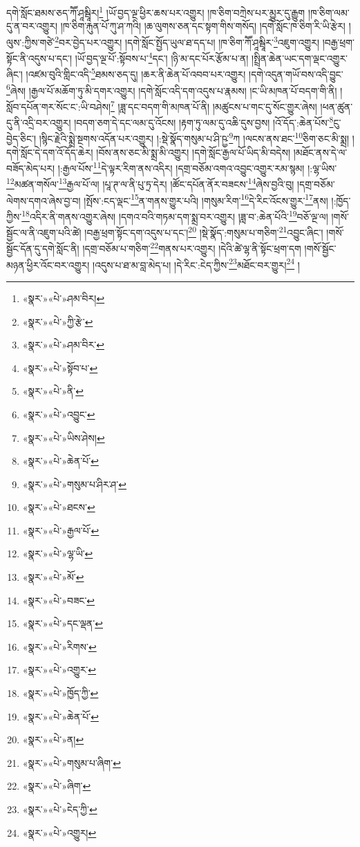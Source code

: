 དགེ་སློང་ཐམས་ཅད་ཀཽ་ཤཱམྦཱིར།\footnote{«སྣར་»«པེ་»ཤམ་བིར།} །ཡོ་བྱད་ལྔ་ཕྱིར་ཆས་པར་འགྱུར། །ཁ་ཅིག་བཀྲེས་པར་མྱུར་དུ་རྒྱུག །ཁ་ཅིག་ལམ་དུ་ན་བར་འགྱུར། །ཁ་ཅིག་རྐུན་པོ་ཀུ་ཤ་ཀའི། །ཆ་ལུགས་ཅན་དང་སྟག་གིས་གསོད། །དགེ་སློང་ཁ་ཅིག་རི་ཡི་རྩེར། །ལུས་:ཀྱིས་གཙེ་\footnote{«སྣར་»«པེ་»ཀྱི་རྩེ་}བར་བྱེད་པར་འགྱུར། །དགེ་སློང་སྤྱོད་ཡུལ་ཐ་དད་པ། །ཁ་ཅིག་ཀཽ་ཤཱམྦཱིར་\footnote{«སྣར་»«པེ་»ཤམ་བིར་}འཇུག་འགྱུར། །བརྒྱ་ཕྲག་སྟོང་ནི་འདུས་པ་དང་། །ཡོ་བྱད་ལྔ་པོ་:སྟོབས་པ་\footnote{«སྣར་»«པེ་»སྟོབ་པ་}དང་། །ཉི་མ་དང་པོར་རྩོམ་པ་ན། །སྤྲིན་ཆེན་ཡང་དག་ལྡང་འགྱུར་ཞིང་། །འཛམ་བུའི་གླིང་འདི་\footnote{«སྣར་»«པེ་»ནི་}ཐམས་ཅད་དུ། །ཆར་ནི་ཆེན་པོ་འབབ་པར་འགྱུར། །དགེ་འདུན་གཡོ་བས་འདི་བྱུང་\footnote{«སྣར་»«པེ་»འབྱུང་}ཞེས། །རྒྱལ་པོ་མཆོག་ཏུ་མི་དགར་འགྱུར། །དགེ་སློང་འདི་དག་འདུས་པ་རྣམས། །ང་ཡི་མཁན་པོ་བདག་གི་ནི། །སློབ་དཔོན་གར་སོང་ང་:ཡི་བཤེས།\footnote{«སྣར་»«པེ་»ཡིས་ཤེས།} །ཟླ་དང་བདག་གི་མཁན་པོ་ནི། །མཚུངས་པ་གང་དུ་སོང་གྱུར་ཞེས། །ཕན་ཚུན་དུ་ནི་འདྲི་བར་འགྱུར། །བདག་ཅག་དེ་དང་ལམ་དུ་འོངས། །རྟག་ཏུ་ལམ་དུ་འཆི་དུས་བྱས། །འོ་དོད་:ཆེན་པོས་\footnote{«སྣར་»«པེ་»ཆེན་པོ་}ངུ་བྱེད་ཅིང་། །སྙིང་རྗེའི་སྨྲེ་སྔགས་འདོན་པར་འགྱུར། །:སྡེ་སྣོད་གསུམ་པ་ཤི་ཥྱ་\footnote{«སྣར་»«པེ་»གསུམ་པ་ཤིར་ཤ་}ཀ །ལངས་ནས་ཐང་\footnote{«སྣར་»«པེ་»ཐངས་}ཅིག་ཅང་མི་སྨྲ། །དགེ་སློང་དེ་དག་འོ་དོད་ཆེར། །བོས་ནས་ཅང་མི་སྨྲ་མི་འགྱུར། །དགེ་སློང་རྒྱལ་པོ་ཡིད་མི་བདེས། །མཐོང་ནས་དེ་ལ་བཟོད་མེད་པར། །:རྒྱལ་པོས་\footnote{«སྣར་»«པེ་»རྒྱལ་པོ་}དེ་ལྟར་རིག་ནས་འདིར། །དགྲ་བཅོམ་འགའ་འབྱུང་འགྱུར་རམ་སྙམ། །:ལྷ་ཡིས་\footnote{«སྣར་»«པེ་»ལྷ་ཡི་}མཚན་གསོལ་\footnote{«སྣར་»«པེ་»མོ་}རྒྱལ་པོ་ལ། །པཱ་ཊ་ལ་ནི་པུ་ཏྲ་དེར། །ཚོང་དཔོན་ནོར་བཟངས་\footnote{«སྣར་»«པེ་»བཟང་}ཞེས་བྱའི་བུ། །དགྲ་བཅོམ་ལེགས་དགའ་ཞེས་བྱ་བ། །སྤོས་:ངད་ལྡང་\footnote{«སྣར་»«པེ་»དང་ལྡན་}ན་གནས་གྱུར་པའི། །གསུམ་རིག་\footnote{«སྣར་»«པེ་»རིགས་}དེ་རིང་འོངས་གྱུར་\footnote{«སྣར་»«པེ་»འགྱུར་}ནས། །:ཁྱོད་ཀྱིས་\footnote{«སྣར་»«པེ་»ཁྱོད་ཀྱི་}འདིར་ནི་གནས་འགྱུར་ཞེས། །དགའ་བའི་གཏམ་དག་སྨྲ་བར་འགྱུར། །ཟླ་བ་:ཆེན་པོའི་\footnote{«སྣར་»«པེ་»ཆེན་པོ་}བཅོ་ལྔ་ལ། །གསོ་སྦྱོང་ལ་ནི་འཇུག་པའི་ཚེ། །བརྒྱ་ཕྲག་སྟོང་དག་འདུས་པ་དང་།\footnote{«སྣར་»«པེ་»ན།} །སྡེ་སྣོད་:གསུམ་པ་གཅིག་\footnote{«སྣར་»«པེ་»གསུམ་པ་ཞིག་}འབྱུང་ཞིང་། །གསོ་སྦྱོང་དོན་དུ་དགེ་སློང་ནི། །དགྲ་བཅོམ་པ་གཅིག་\footnote{«སྣར་»«པེ་»ཞིག་}གནས་པར་འགྱུར། །དེའི་ཚེ་ལྷ་ནི་སྟོང་ཕྲག་དག །གསོ་སྦྱོང་མཉན་ཕྱིར་འོང་བར་འགྱུར། །འདུས་པ་ཐ་མ་བླ་མེད་པ། །དེ་རིང་:ངེད་ཀྱིས་\footnote{«སྣར་»«པེ་»ངེད་ཀྱི་}མཐོང་བར་གྱུར།\footnote{«སྣར་»«པེ་»འགྱུར།} །
